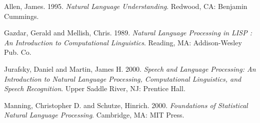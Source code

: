 \documentclass{article}
\begin{document}
\begin{thebibliography}{1}

{Allen, James.  1995.  
 \emph{Natural Language Understanding}.
 Redwood, CA: Benjamin Cummings.}



{Gazdar, Gerald and Mellish, Chris.  1989.
 \emph{Natural Language Processing in LISP : An Introduction to
       Computational Linguistics}. 
 Reading, MA: Addison-Wesley Pub. Co.}

{Jurafsky, Daniel and Martin, James H.  2000.
 \emph{Speech and Language Processing: An Introduction to Natural
       Language Processing, Computational Linguistics, and Speech
       Recognition}.
 Upper Saddle River, NJ: Prentice Hall.}

{Manning, Christopher D. and Schutze, Hinrich.  2000.  
 \emph{Foundations of Statistical Natural Language Processing}.
 Cambridge, MA: MIT Press.}


\end{thebibliography}
\end{document}
